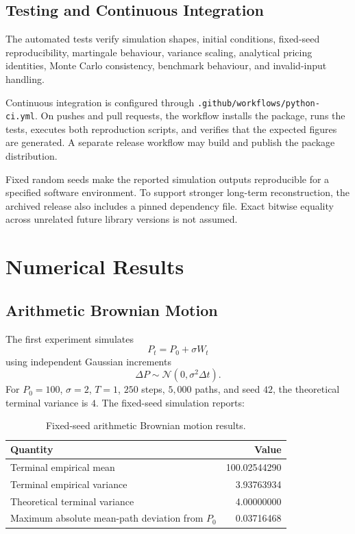\documentclass[11pt,a4paper]{article}
\begin{document}
\subsection{Testing and Continuous Integration}

The automated tests verify simulation shapes, initial conditions, fixed-seed reproducibility, martingale behaviour, variance scaling, analytical pricing identities, Monte Carlo consistency, benchmark behaviour, and invalid-input handling.

Continuous integration is configured through \texttt{.github/workflows/python-ci.yml}. On pushes and pull requests, the workflow installs the package, runs the tests, executes both reproduction scripts, and verifies that the expected figures are generated. A separate release workflow may build and publish the package distribution.

Fixed random seeds make the reported simulation outputs reproducible for a specified software environment. To support stronger long-term reconstruction, the archived release also includes a pinned dependency file. Exact bitwise equality across unrelated future library versions is not assumed.

\section{Numerical Results}

\subsection{Arithmetic Brownian Motion}

The first experiment simulates
\[
P_t=P_0+\sigma W_t
\]
using independent Gaussian increments
\[
\Delta P\sim\mathcal{N}(0,\sigma^2\Delta t).
\]
For \(P_0=100\), \(\sigma=2\), \(T=1\), \(250\) steps, \(5{,}000\) paths, and seed \(42\), the theoretical terminal variance is \(4\). The fixed-seed simulation reports:

\begin{table}[htbp]
\centering
\caption{Fixed-seed arithmetic Brownian motion results.}
\label{tab:brownian-results}
\begin{tabular}{lr}
\toprule
Quantity & Value \\
\midrule
Terminal empirical mean & 100.02544290 \\
Terminal empirical variance & 3.93763934 \\
Theoretical terminal variance & 4.00000000 \\
Maximum absolute mean-path deviation from \(P_0\) & 0.03716468 \\
\bottomrule
\end{tabular}
\end{table}
\end{document}
